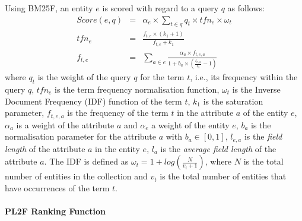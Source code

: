 Using BM25F, an entity $e$ is scored with regard to a query $q$ as follows:
\begin{eqnarray}
  Score(e,q) & = & \alpha_e\times\sum_{t\in q}{q_t\times tfn_e \times \omega_t}\\
  \label{eq:tfidf-score}
  tfn_e & = & \frac{f_{t,e}\times(k_1+1)}{f_{t,e}+k_1} \\
  \label{eq:bm25f_2}
  f_{t,e} & = &
  \sum_{a\in e}{\frac{\alpha_a\times f_{t,e,a}}{1+b_a\times\left(\frac{l_{e,a}}{l_a}-1\right)}}
  \label{eq:bm25f_1}
\end{eqnarray}
where $q_t$ is the weight of the query $q$ for the term $t$, i.e., its frequency within the query $q$, $tfn_e$ is the term frequency normalisation function, $\omega_t$ is the Inverse Document Frequency (IDF) function of the term $t$, $k_1$ is the saturation parameter, $f_{t,e,a}$ is the frequency of the term $t$ in the attribute $a$ of the entity $e$, $\alpha_a$ is a weight of the attribute $a$ and $\alpha_e$ a weight of the entity $e$, $b_a$ is the normalisation parameter for the attribute $a$ with $b_a \in \left[0,1\right]$, $l_{e,a}$ is the \emph{field length} of the attribute $a$ in the entity $e$, $l_a$ is the \emph{average field length} of the attribute $a$. The IDF is defined as
$
\omega_t=1+log\left(\frac{N}{v_t+1}\right)
$,
where $N$ is the total number of entities in the collection and $v_t$ is the total number of entities that have occurrences of the term $t$.

\paragraph{PL2F Ranking Function}

